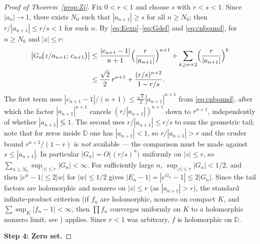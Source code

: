 \documentclass[12pt]{amsart}
\theoremstyle{definition}
\newcommand{\D}{\mathbb{D}}
\newcommand{\abs}[1]{\left|#1\right|}
\begin{document}
\begin{proof}[Proof of Theorem~\ref{prop:Zi}]
Fix $0 < r < 1$ and choose $s$ with $r < s < 1$.  Since
$\abs{a_n} \to 1$, there exists $N_0$ such that $\abs{a_{n+1}} \geq s$
for all $n \geq N_0$; then $r/\abs{a_{n+1}} \leq r/s < 1$ for such $n$.
By \eqref{eq:Eexp}--\eqref{eq:Gdef} and \eqref{eq:cnbound}, for $n \geq
N_0$ and $\abs{z} \leq r$:
\begin{align*}
  \abs{G_n\!\bigl(z/a_{n+1};\,c_{n+1}\bigr)}
  &\leq \frac{\abs{c_{n+1}-1}}{n+1}\Bigl(\frac{r}{\abs{a_{n+1}}}\Bigr)^{n+1}
    + \sum_{k \geq n+2} \Bigl(\frac{r}{\abs{a_{n+1}}}\Bigr)^k \\
  &\leq \frac{\sqrt{2}}{2}\,r^{n+1}
    + \frac{(r/s)^{n+2}}{1-r/s}.
\end{align*}
The first term uses $\abs{c_{n+1}-1}/(n+1) \leq
\frac{\sqrt{2}}{2}\abs{a_{n+1}}^{n+1}$ from \eqref{eq:cnbound}, after
which the factor $\abs{a_{n+1}}^{n+1}$ cancels
$(r/\abs{a_{n+1}})^{n+1}$ down to $r^{n+1}$, independently of whether
$\abs{a_{n+1}} \lessgtr 1$.  The second uses $r/\abs{a_{n+1}} \leq r/s$
to sum the geometric tail; note that for zeros inside $\D$ one has
$\abs{a_{n+1}} < 1$, so $r/\abs{a_{n+1}} > r$ and the cruder bound
$r^{n+2}/(1-r)$ is \emph{not} available — the comparison must be made
against $s \leq \abs{a_{n+1}}$.  In particular
$\abs{G_n} = O\bigl((r/s)^{n}\bigr)$ uniformly on $\abs{z} \leq r$, so
$\sum_{n \geq N_0} \sup_{\abs{z}\leq r} \abs{G_n} < \infty$.  For
sufficiently large $n$,
$\sup_{\abs{z}\leq r}\abs{G_n} < 1/2$, and then $\abs{e^w - 1} \leq
2\abs{w}$ for $\abs{w} \leq 1/2$ gives $\abs{E_n - 1} = \abs{e^{G_n}
- 1} \leq 2\abs{G_n}$.  Since the tail factors are holomorphic and
nonzero on $\abs{z} \leq r$ (as $\abs{a_{n+1}} > r$), the standard
infinite-product criterion (if $f_n$ are holomorphic, nonzero on
compact $K$, and $\sum \sup_K \abs{f_n - 1} < \infty$, then $\prod
f_n$ converges uniformly on $K$ to a holomorphic nonzero limit; see
\cite[Ch.~5, Thm.~1.1]{Conway}) applies.  Since $r < 1$ was arbitrary,
$f$ is holomorphic on $\D$.

\medskip\noindent\textbf{Step 4: Zero set.}


\end{proof}
\end{document}
